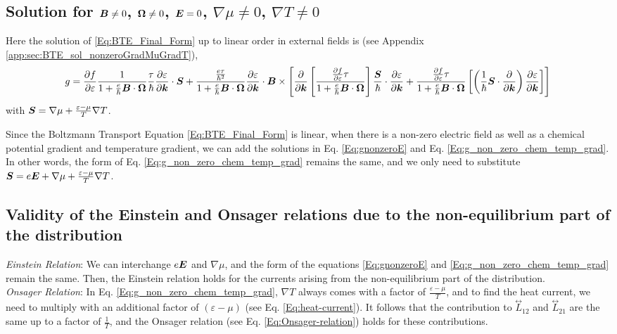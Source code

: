 \documentclass{report}
\renewcommand\vec[1]{\ensuremath\boldsymbol{#1}} %
\begin{document}
\subsection{Solution for $\vec{B}\neq0$, $\vec{\Omega}\neq 0$, $\vec{E} = 0$, $\nabla \mu \neq 0$, $\nabla T \neq 0$}

Here the solution of \eqref{Eq:BTE_Final_Form} up to linear order in external fields is (see Appendix \ref{app:sec:BTE_sol_nonzeroGradMuGradT}),
\begin{equation}\label{Eq:g_non_zero_chem_temp_grad}
	g = \frac{\partial f} {\partial \varepsilon}\frac{1}{1 + \frac{e}{\hbar} \vec{B}\cdot\vec{\Omega}}
	\frac{\tau}{\hbar} \frac{\partial \varepsilon}{\partial \vec{k}}\cdot  \vec{S} + \frac{\frac{e \tau}{\hbar^2} }{1 + \frac{e}{\hbar} \vec{B}\cdot\vec{\Omega}} \frac{\partial \varepsilon}{\partial \vec{k}} \cdot \vec{B} \times \left[ \frac{\partial}{\partial \vec{k}} \left[ \frac{\frac{\partial f} {\partial \varepsilon} \tau}{1 + \frac{e}{\hbar} \vec{B}\cdot\vec{\Omega}}
	\right] \frac{\vec{S}}{\hbar} \cdot \frac{\partial \varepsilon}{\partial \vec{k}} + \frac{\frac{\partial f} {\partial \varepsilon} \tau}{1 + \frac{e}{\hbar} \vec{B}\cdot\vec{\Omega}} \left[\left(\frac{1}{\hbar} \vec{S}\cdot \frac{\partial }{\partial \vec{k}} \right)\frac{\partial \varepsilon}{\partial \vec{k}} \right] \right]
\end{equation}
with $\vec{S} = \nabla \mu + \frac{\varepsilon - \mu}{T} \nabla T$.

Since the Boltzmann Transport Equation \eqref{Eq:BTE_Final_Form} is linear, when there is a non-zero electric field as well as a chemical potential gradient and temperature gradient, we can add the solutions in Eq. \eqref{Eq:gnonzeroE} and Eq. \eqref{Eq:g_non_zero_chem_temp_grad}. In other words, the form of Eq. \eqref{Eq:g_non_zero_chem_temp_grad} remains the same, and we only need to substitute $\vec{S} = e \vec{E} + \nabla \mu + \frac{\varepsilon - \mu}{T} \nabla T$.

\subsection{Validity of the Einstein and Onsager relations due to the non-equilibrium part of the distribution}\label{sec:non-eq-Einstein-Onsager}
\textit{Einstein Relation}: We can interchange $e\vec{E}$ and $\nabla \mu$, and the form of the equations \eqref{Eq:gnonzeroE} and \eqref{Eq:g_non_zero_chem_temp_grad} remain the same. Then, the Einstein relation holds for the currents arising from the non-equilibrium part of the distribution.\\
\textit{Onsager Relation}: In Eq. \eqref{Eq:g_non_zero_chem_temp_grad}, $\nabla T$ always comes with a factor of $\frac{\varepsilon - \mu}{T}$, and to find the heat current, we need to multiply with an additional factor of $({\varepsilon - \mu})$ (see Eq. \eqref{Eq:heat-current}). It follows that the contribution to $\stackrel{\leftrightarrow}{L}_{12}$ and $\stackrel{\leftrightarrow}{L}_{21}$ are the same up to a factor of $\frac{1}{T}$, and the Onsager relation (see Eq. \eqref{Eq:Onsager-relation}) holds for these contributions.
\end{document}
